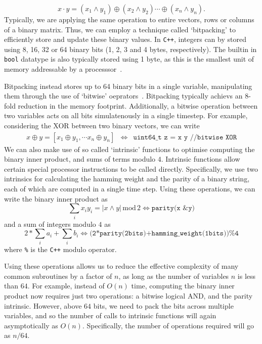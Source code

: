 \[x\cdot y = \left(x_{1}\wedge y_{1}\right)\oplus\left(x_{2}\wedge y_{2}\right)\cdots\oplus\left(x_{n}\wedge y_{n}\right).\]
Typically, we are applying the same operation to entire vectors, rows or columns of a binary matrix. Thus, we can employ a technique called `bitpacking' to efficiently store and update these binary values. In \texttt{C++}, integers can by stored using 8, 16, 32 or 64 binary bits (1, 2, 3 and 4 bytes, respectively). The builtin in \texttt{bool} datatype is also typically stored using 1 byte, as this is the smallest unit of memory addressable by a processsor~\cite{CPPRefTypes}.\par
Bitpacking instead stores up to 64 binary bits in a single variable, manipulating them through the use of `bitwise' oeprators~\cite{CPPRefBitwise}. Bitpacking typically achievs an $8$-fold reduction in the memory footprint. Additionally, a bitwise operation between two variables acts on all bits simulatenously in a single timestep. For example, considering the XOR between two binary vectors, we can write
\[
\begin{array}{rcl}
x\oplus y = [x_{1}\oplus y_{1},\cdots x_{n}\oplus y_{n}] & \iff &
\texttt{uint64\_t z = x \^{} y //bitwise XOR}
\end{array}
\]
We can also make use of so called `intrinsic' functions to optimise computing the binary inner product, and sums of terms modulo $4$. Intrinsic functions allow certain special processor instructions to be called directly. Specifically, we use two intrinsics for calculating the hamming weight and the parity of a binary string, each of which are computed in a single time step. Using these operations, we can write the binary inner product as
\[\sum_{i}x_{i}y_{i} = \left\vert x\wedge y\right\vert\,\text{mod}\,2\iff \texttt{parity(x \& y)}\]
and a sum of integers modulo $4$ as
\[2*\sum_{i}a_{i}+\sum_{i}b_{i}\iff \texttt{(2*parity(2bits)+hamming\_weight(1bits))\%4}\]
where \texttt{\%} is the \texttt{C++} modulo operator.\par
Using these operations allows us to reduce the effective complexity of many common subroutines by a factor of $n$, as long as the number of variables $n$ is less than $64$. For example, instead of $O(n)$ time, computing the binary inner product now requires just two operations: a bitwise logical AND, and the parity intrinsic. However, above $64$ bits, we need to pack the bits across multiple variables, and so the number of calls to intrinsic functions will again asymptotically as $O(n)$. Specifically, the number of operations required will go as $n/64$.\par
